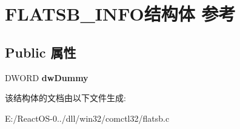\hypertarget{struct_f_l_a_t_s_b___i_n_f_o}{}\section{F\+L\+A\+T\+S\+B\+\_\+\+I\+N\+F\+O结构体 参考}
\label{struct_f_l_a_t_s_b___i_n_f_o}
\subsection*{Public 属性}
\begin{DoxyCompactItemize}
\item 
\mbox{\label{struct_f_l_a_t_s_b___i_n_f_o_aff0124dbfc142d16dbdb34df34b1c11c}} 
D\+W\+O\+RD {\bfseries dw\+Dummy}
\end{DoxyCompactItemize}


该结构体的文档由以下文件生成\+:\begin{DoxyCompactItemize}
\item 
E\+:/\+React\+O\+S-\/0../dll/win32/comctl32/flatsb.\+c\end{DoxyCompactItemize}
